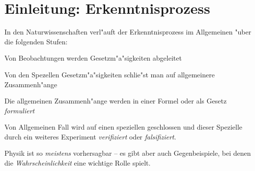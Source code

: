 \chapter{Einleitung: Erkenntnisprozess}

In den Naturwissenschaften verl"auft der Erkenntnisprozess im
Allgemeinen "uber die folgenden Stufen:

\begin{description}[\setlabelstyle{\bfseries\slshape}]
\item[Experiment] Von Beobachtungen werden Gesetzm"a"sigkeiten
   abgeleitet
\item[Induktion] Von den Spezellen Gesetzm"a"sigkeiten schlie"st man auf
   allgemeinere Zusammenh"ange
\item[Formulierung] Die allgemeinen Zusammenh"ange werden in einer
   Formel oder als Gesetz \emph{formuliert}
\item[Deduktion] Von Allgemeinen Fall wird auf einen speziellen
   geschlossen und dieser Spezielle durch ein weiteres Experiment
   \emph{verifiziert} oder \emph{falsifiziert}.
\end{description}

Physik ist so \emph{meistens} vorhersagbar -- es gibt aber auch
Gegenbeispiele, bei denen die \emph{Wahrscheinlichkeit} eine wichtige
Rolle spielt.

